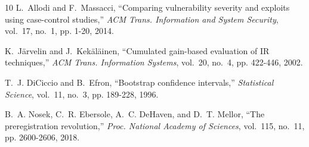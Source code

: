 \documentclass[journal]{IEEEtran}
\begin{document}
\begin{thebibliography}{10}
 L.~Allodi and F.~Massacci, ``Comparing vulnerability severity and exploits using case-control studies,'' \emph{ACM Trans. Information and System Security}, vol.~17, no.~1, pp. 1-20, 2014.

 K.~J\"arvelin and J.~Kek\"al\"ainen, ``Cumulated gain-based evaluation of IR techniques,'' \emph{ACM Trans. Information Systems}, vol.~20, no.~4, pp. 422-446, 2002.

 T.~J. DiCiccio and B.~Efron, ``Bootstrap confidence intervals,'' \emph{Statistical Science}, vol.~11, no.~3, pp. 189-228, 1996.

 B.~A. Nosek, C.~R. Ebersole, A.~C. DeHaven, and D.~T. Mellor, ``The preregistration revolution,'' \emph{Proc. National Academy of Sciences}, vol.~115, no.~11, pp. 2600-2606, 2018.

\end{thebibliography}
\end{document}
